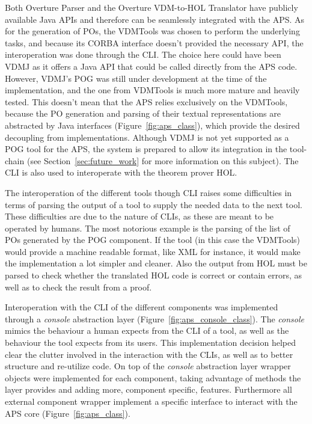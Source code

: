 \documentclass[]{article}
\begin{document}
Both Overture Parser and the Overture VDM-to-HOL Translator have publicly available Java APIs and therefore can be seamlessly integrated with the APS.
As for the generation of POs, the VDMTools was chosen to perform the underlying tasks, and because its CORBA interface doesn't provided the necessary API, the interoperation was done through the CLI.
The choice here could have been VDMJ as it offers a Java API that could be called directly from the APS code.
However, VDMJ's POG was still under development at the time of the implementation, and the one from VDMTools is much more mature and heavily tested.
This doesn't mean that the APS relies exclusively on the VDMTools, because the PO generation and parsing of their textual representations are abstracted by Java interfaces (Figure~\ref{fig:aps_class}), which provide the desired decoupling from implementations.
Although VDMJ is not yet supported as a POG tool for the APS, the system is prepared to allow its integration in the tool-chain (see Section~\ref{sec:future_work} for more information on this subject).
The CLI is also used to interoperate with the theorem prover HOL.

The interoperation of the different tools though CLI raises some difficulties in terms of parsing the output of a tool to supply the needed data to the next tool.
These difficulties are due to the nature of CLIs, as these are meant to be operated by humans.
The most notorious example is the parsing of the list of POs generated by the POG component.
If the tool (in this case the VDMTools) would provide a machine readable format, like XML for instance, it would make the implementation a lot simpler and cleaner.
Also the output from HOL must be parsed to check whether the translated HOL code is correct or contain errors, as well as to check the result from a  proof.

Interoperation with the CLI of the different components was implemented through a \emph{console} abstraction layer (Figure~\ref{fig:aps_console_class}).
The \emph{console} mimics the behaviour a human expects from the CLI of a tool, as well as the behaviour the tool expects from its users.
This implementation decision helped clear the clutter involved in the interaction with the CLIs, as well as to better structure and re-utilize code.
On top of the \emph{console} abstraction layer wrapper objects were implemented for each component, taking advantage of methods the layer provides and adding more, component specific, features.
Furthermore all external component wrapper implement a specific interface to interact with the APS core (Figure~\ref{fig:aps_class}).
\end{document}
